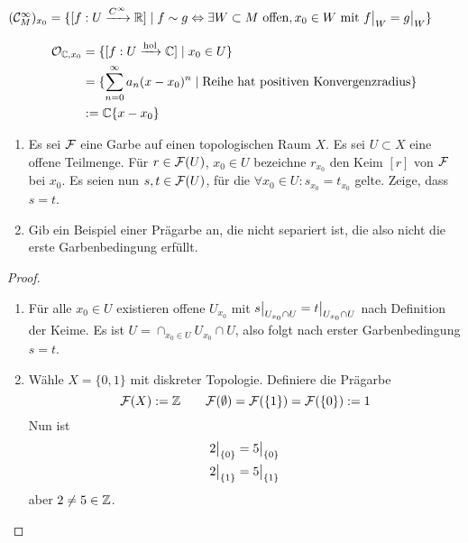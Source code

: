\begin{beispiel}
	$(\mathcal C^\infty_M)_{x_0} = \{ [f: U \xrightarrow{C^\infty} \mathbb{R}]\mid
  	f\sim g \Leftrightarrow \exists W\subset M\text{ offen}, x_0 \in W
  	\text{ mit } f\big|_{W} = g\big|_{W}\}$
\end{beispiel}
\begin{beispiel}
	\begin{align*}
	  	\mathcal O_{\mathbb{C},x_0} &= \{[f:U \xrightarrow{\text{hol}} \mathbb{C}] \mid x_0 \in U\}\\
	  	&= \{\sum_{n=0}^\infty a_n(x-x_0)^n \mid \text{Reihe hat positiven 
	  	Konvergenzradius}\}\\
	  	&:= \mathbb{C}\{x-x_0\}
	\end{align*}
\end{beispiel}



\begin{uebung}
	\begin{enumerate}
	  \item Es sei $\mathcal{F}$ eine Garbe auf einen topologischen Raum $X$.
	  Es sei $U\subset X$ eine offene Teilmenge. Für $r\in \mathcal{F}(U)$, $x_0 \in U$
	  bezeichne $r_{x_0}$ den Keim $[r]$ von $\mathcal{F}$ bei $x_0$. Es seien
	  nun $s,t \in \mathcal{F}(U)$, für die $\forall x_0 \in U: s_{x_0} = t_{x_0}$ 
	  gelte. Zeige, dass $s=t$.
	  \item Gib ein Beispiel einer Prägarbe an, die nicht separiert ist,
	  die also nicht die erste Garbenbedingung erfüllt.
	\end{enumerate}
\end{uebung}
\begin{proof}
	\begin{enumerate}
	  \item Für alle $x_0 \in U$ existieren offene $U_{x_0}$ mit
	  	$s \big|_{U_{x_0} \cap U} = t\big|_{U_{x_0} \cap U}$ nach Definition
	  	der Keime. Es ist $U = \cap_{x_0 \in U} U_{x_0} \cap U$, also
	  	folgt nach erster Garbenbedingung $s=t$.
	  \item Wähle $X = \{0,1\}$ mit diskreter Topologie.
	  	Definiere die Prägarbe
	  	\[\mathcal{F}(X) := \mathbb{Z} \qquad \mathcal{F}(\emptyset) = \mathcal{F}(\{1\}) = \mathcal{F}(\{0\}) := 1\]
	  	Nun ist
	  	\begin{align*}
	  		2\big|_{\{0\}} &= 5\big|_{\{0\}} \\
	  		2\big|_{\{1\}} &= 5\big|_{\{1\}}
	  	\end{align*}
	  	aber $2\neq 5 \in \mathbb{Z}$.
	\end{enumerate}
\end{proof}

